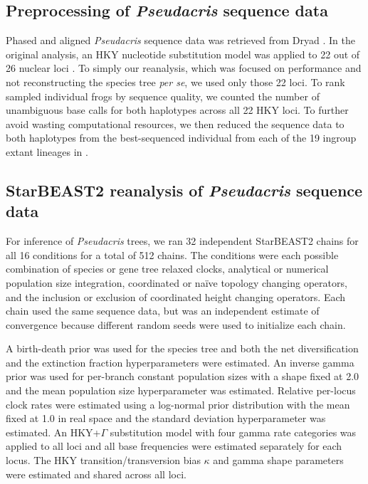 \documentclass[12pt]{article}
\begin{document}
\subsection*{Preprocessing of \textit{Pseudacris} sequence data}

Phased and aligned \textit{Pseudacris} sequence data was retrieved from Dryad
\citep{dryad_23rc0}. In the original analysis, an HKY nucleotide substitution
model was applied to 22 out of 26 nuclear loci \citep{Barrow201478}. To simply
our reanalysis, which was focused on performance and not reconstructing the
species tree \textit{per se}, we used only those 22 loci. To rank sampled
individual frogs by sequence quality, we counted the number of unambiguous base
calls for both haplotypes across all 22 HKY loci. To further avoid wasting
computational resources, we then reduced the sequence data to both haplotypes
from the best-sequenced individual from each of the 19 ingroup extant lineages
in \cite{Barrow201478}.

\subsection*{StarBEAST2 reanalysis of \textit{Pseudacris} sequence data}

For inference of \textit{Pseudacris} trees, we ran 32 independent StarBEAST2
chains for all 16 conditions for a total of 512 chains. The conditions were each
possible combination of species or gene tree relaxed clocks, analytical or
numerical population size integration, coordinated or na\"ive topology changing
operators, and the inclusion or exclusion of coordinated height changing
operators. Each chain used the same sequence data, but was an independent
estimate of convergence because different random seeds were used to initialize
each chain.

A birth-death prior was used for the species tree and both the net diversification
and the extinction fraction hyperparameters were estimated. An inverse gamma prior was
used for per-branch constant population sizes with a shape fixed at 2.0 and the
mean population size hyperparameter was estimated. Relative per-locus clock
rates were estimated using a log-normal prior distribution with the mean fixed
at 1.0 in real space and the standard deviation hyperparameter was estimated. An
HKY+$\Gamma$ substitution model with four gamma rate categories was applied to
all loci and all base frequencies were estimated separately for each locus. The
HKY transition/transversion bias $\kappa$ and gamma shape parameters were estimated and shared across all loci.
\end{document}
